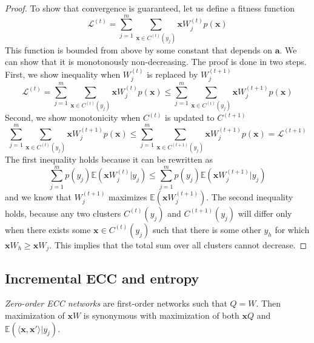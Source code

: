 \documentclass[oneside,english,logo]{amuthesis}
\begin{document}
\begin{proof}
To show that convergence is guaranteed, let us define a fitness function
\[
\mathcal{L}^{(t)} = \sum_{j=1}^m \sum_{\boldsymbol{x}\in C^{(t)}(y_j)} \boldsymbol{x} W_j^{(t)} p(\boldsymbol{x})
\] 
This function is bounded from above by some constant that depends on $\boldsymbol{a}$. We can show that it is monotonously non-decreasing. The proof is done in two steps. First, we show inequality when $W_j^{(t)}$  is replaced by $W_j^{(t+1)}$
\[\mathcal{L}^{(t)}= \sum_{j=1}^m \sum_{\boldsymbol{x}\in C^{(t)}(y_j)} \boldsymbol{x} W_j^{(t)} p(\boldsymbol{x}) \le \sum_{j=1}^m \sum_{\boldsymbol{x}\in C^{(t)}(y_j)} \boldsymbol{x}W_j^{(t+1)} p(\boldsymbol{x})\] 
Second, we show monotonicity when $C^{(t)}$ is updated to $C^{(t+1)}$
\[\sum_{j=1}^m \sum_{\boldsymbol{x}\in C^{(t)}(y_j)} \boldsymbol{x} W_j^{(t+1)} p(\boldsymbol{x}) \le \sum_{j=1}^m \sum_{\boldsymbol{x}\in C^{(t+1)}(y_j)} \boldsymbol{x} W_j^{(t+1)} p(\boldsymbol{x})=\mathcal{L}^{(t+1)}\] 
The first inequality holds because it can be rewritten as
\[\sum_{j=1}^m p(y_j) \mathbb{E}(\boldsymbol{x} W_j^{(t)}|y_j)  \le \sum_{j=1}^m  p(y_j)  \mathbb{E}(\boldsymbol{x}W_j^{(t+1)}|y_j)\] 
and we know that $W_j^{(t+1)}$ maximizes $\mathbb{E}(\boldsymbol{x}W_j^{(t+1)})$.
The second inequality holds, because any two clusters $C^{(t)}(y_j)$ and  $C^{(t+1)}(y_j)$ will differ only when there exists some $\boldsymbol{x}\in C^{(t)}(y_j)$ such that there is some other $y_h$ for which $\boldsymbol{x}W_h \ge \boldsymbol{x} W_j$. This implies that the total sum over all clusters cannot decrease.
\end{proof}
	
\subsection{Incremental ECC and entropy}
\begin{definition}
	\textit{Zero-order ECC networks} are first-order networks such that $Q=W$. Then maximization of $\boldsymbol{x}W$ is synonymous with maximization of both $\boldsymbol{x}Q$ and $\mathbb{E}(\langle \boldsymbol{x}, \boldsymbol{x}'\rangle|y_j) $. 
\end{definition}
\end{document}
